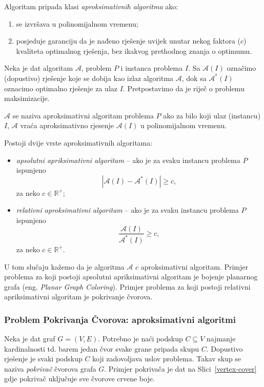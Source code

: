 \documentclass[a4paper, utf8, 11pt, colorlinks]{article}
\begin{document}
  \noindent Algoritam pripada klasi \emph{aproksimativnih algoritma} ako:
  \begin{enumerate}
  	\item se izvršava u polinomijalnom vremenu;
  	\item posjeduje garanciju da je nađeno rješenje uvijek unutar nekog faktora ($c$) kvaliteta optimalnog rješenja, bez ikakvog prethodnog znanja o optimumu.
  \end{enumerate}
  Neka je dat algoritam $\mathcal{A}$, problem $P$ i instanca problema $I$. Sa $\mathcal{A}(I)$ označimo (dopustivo) rješenje koje se dobija kao izlaz algoritma $\mathcal{A}$, dok sa $\mathcal{A}^*(I)$ oznacimo optimalno rješenje za ulaz $I$. Pretpostavimo da je riječ o problemu maksimizacije. 
  
  $\mathcal{A}$ se naziva aproksimativni algoritam problema $P$ ako 
  za bilo koji ulaz (instancu) $I$, $\mathcal{A}$ vraća aproksimativno rjesenje $\mathcal{A}(I)$ u polinomijalnom vremenu. 
  
  Postoji dvije vrste aproksimativnih algoritama:
  \begin{itemize}
  	\item \emph{apsolutni apriksimativni algoritam} -- ako je za svaku instancu problema $P$ ispunjeno
  	$$ |\mathcal{A}(I) - \mathcal{A}^*(I)| \geq c,$$ za neko $c\in \mathbb{R}^+$;
  	\item \emph{relativni aproksimativni algoritam} -- ako je   za svaku instancu problema $P$ ispunjeno
  	$$\frac{\mathcal{A}(I)}{\mathcal{A}^*(I)} \geq c,$$ za neko $c\in \mathbb{R}^+$.
  \end{itemize}
  
  \noindent U tom slučaju kažemo da je algoritma $\mathcal{A}$ $c$ aproksimativni algoritam.
  Primjer problema za koji postoji apsolutni apriksimativni algoritam je bojenje planarnog grafa (eng. \emph{Planar Graph Coloring}). Primjer problema za koji postoji relativni apriksimativni algoritam je pokrivanje čvorova. 
  
  \subsubsection{Problem Pokrivanja Čvorova: aproksimativni algoritmi}
  
  Neka je dat graf $G=(V,E)$. Potrebno je naći podskup $C\subseteq V$ najmanje kardinalnosti td. barem jedan čvor svake grane pripada skupu $C$.  Dopustivo rješenje je svaki podskup $C$ koji zadovoljava uslov problema. Takav skup se naziva \emph{pokrivač} čvorova grafa $G$. Primjer pokrivača je dat na Slici~\ref{vertex-cover} gdje pokrivač uključuje sve čvorove crvene boje. 
  
\end{document}
